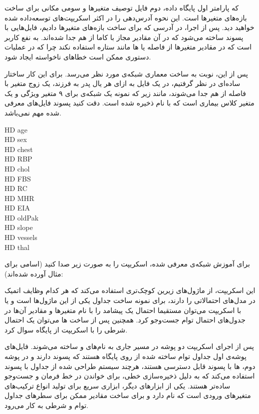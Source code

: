 \documentclass[11.5pt,a4paper]{article}
\begin{document}
که پارامتر اول پایگاه داده، دوم فایل توصیف متغیرها و سومی مکانی برای ساخت بازه‌های متغیرها است. این نحوه آدرس‌دهی را در اکثر اسکریپت‌های توسعه‌داده شده خواهید دید. پس از اجرا، در آدرسی که برای ساخت بازه‌های متغیرها دادیم، 
فایل‌هایی با پسوند  ساخته می‌شود که در آن مقادیر مجاز با کاما از هم جدا شده‌اند. به نفع کاربر است که در مقادیر متغیرها از فاصله یا ها مانند ستاره استفاده نکند چرا که در عملیات دستوری ممکن‌ است خطاهای ناخواسته ایجاد شود.

پس از این، نوبت به ساخت معماری شبکه‌ی مورد نظر می‌رسد. برای این کار ساختار ساده‌ای در نظر گرفتیم، در یک فایل به ازای هر یال پدر به فرزند، یک زوج متغیر با فاصله از هم جدا می‌شوند، مانند زیر که نمونه یک شبکه‌ی  برای ۹ متغیر ویژگی و یک متغیر کلاس بیماری است که با نام  ذخیره شده است. دقت کنید پسوند فایل‌های معرفی شده مهم نمی‌باشد. 
\begin{latin}
\noindent
HD age\\
HD sex\\
HD chest\\
HD RBP\\
HD chol\\
HD FBS\\
HD RC\\
HD MHR\\
HD EIA\\
HD oldPak\\
HD slope\\
HD vessels\\
HD thal\\
\end{latin}

برای آموزش شبکه‌ی معرفی شده، اسکریپت  را به صورت زیر صدا کنید (اسامی برای مثال آورده شده‌اند):


{\footnotesize{}}

این اسکریپت، از ماژول‌های زیرین کوچک‌تری استفاده می‌کند که هر کدام وظایف اتمیک در مدل‌های احتمالاتی را دارند، برای نمونه ساخت جداول  یکی از این ماژول‌ها است و یا با اسکریپت  می‌توان مستقیما احتمال یک پیشامد را با نام متغیرها و مقادیر آن‌ها در جدول‌های احتمال توام جست‌و‌جو کرد. همچنین پس از ساخت  ها می‌توان یک احتمال شرطی را با اسکریپت  از پایگاه سوال کرد. 

پس از اجرای اسکریپت  دو پوشه در مسیر جاری به نام‌های  و  ساخته می‌شوند. فایل‌های پوشه‌ی اول جداول توام ساخته شده از روی پایگاه هستند که پسوند  دارند و در پوشه دوم،  ها با پسوند  قابل دسترسی هستند، هرچند سیستم طراحی شده از جداول با پسوند  استفاده می‌کند که به دلیل ذخیره‌سازی خطی، برای خواندن در خط فرمان و جست‌و‌جو ساده‌تر هستند. یکی از ابزارهای دیگر، ابزاری سریع برای تولید انواع ترکیب‌های متغیرهای ورودی است که  نام‌ دارد و برای ساخت مقادیر ممکن برای سطرهای جداول توام و شرطی به کار می‌رود. 
\end{document}

